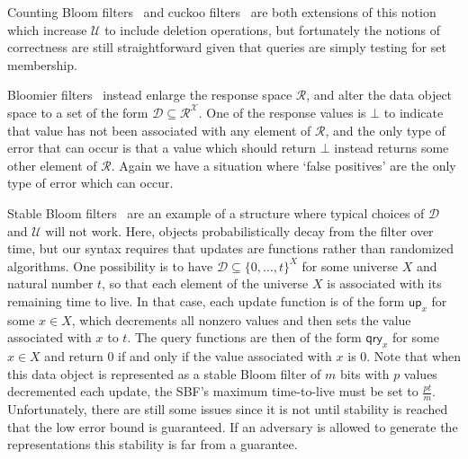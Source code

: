 Counting Bloom filters~\cite{xxx} and cuckoo filters~\cite{xxx} are both extensions of this notion which increase $\mathcal{U}$ to include deletion operations, but fortunately the notions of correctness are still straightforward given that queries are simply testing for set membership.   

Bloomier filters~\cite{xxx} instead enlarge the response space $\mathcal{R}$, and alter the data object space to a set of the form $\mathcal{D} \subseteq \mathcal{R}^\mathcal{X}$.  One of the response values is $\bot$ to indicate that value has not been associated with any element of $\mathcal{R}$, and the only type of error that can occur is that a value which should return $\bot$ instead returns some other element of $\mathcal{R}$. Again we have a situation where `false positives' are the only type of error which can occur.

Stable Bloom filters~\cite{xxx} are an example of a structure where typical choices of $\mathcal{D}$ and $\mathcal{U}$ will not work. Here, objects probabilistically decay from the filter over time, but our syntax requires that updates are functions rather than randomized algorithms.   One possibility is to have $\mathcal{D} \subseteq \{0,\ldots,t\}^X$ for some universe $X$ and natural number $t$, so that each element of the universe $X$ is associated with its remaining time to live.   In that case, each update function is of the form $\mathsf{up}_x$ for some $x \in X$, which decrements all nonzero values and then sets the value associated with $x$ to $t$. The query functions are then of the form $\mathsf{qry}_x$ for some $x \in X$ and return 0 if and only if the value associated with $x$ is 0. Note that when this data object is represented as a stable Bloom filter of $m$ bits with $p$ values decremented each update, the SBF's maximum time-to-live must be set to $\frac{pt}{m}$. Unfortunately, there are still some issues since it is not until stability is reached that the low error bound is guaranteed. If an adversary is allowed to generate the representations this stability is far from a guarantee.

